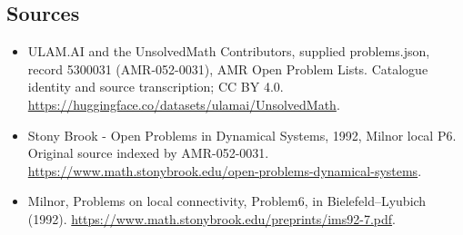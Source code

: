 \documentclass[11pt,a4paper]{article}
\begin{document}
\subsection{Sources}
\begin{itemize}
\item[S1] ULAM.AI and the UnsolvedMath Contributors, supplied problems.json, record 5300031 (AMR-052-0031), AMR Open Problem Lists. Catalogue identity and source transcription; CC BY 4.0.
\url{https://huggingface.co/datasets/ulamai/UnsolvedMath}.
\item[S2] Stony Brook - Open Problems in Dynamical Systems, 1992, Milnor local P6. Original source indexed by AMR-052-0031.
\url{https://www.math.stonybrook.edu/open-problems-dynamical-systems}.
\item[S3] Milnor, Problems on local connectivity, Problem6, in Bielefeld–Lyubich (1992).
\url{https://www.math.stonybrook.edu/preprints/ims92-7.pdf}.
\end{itemize}
\end{document}
